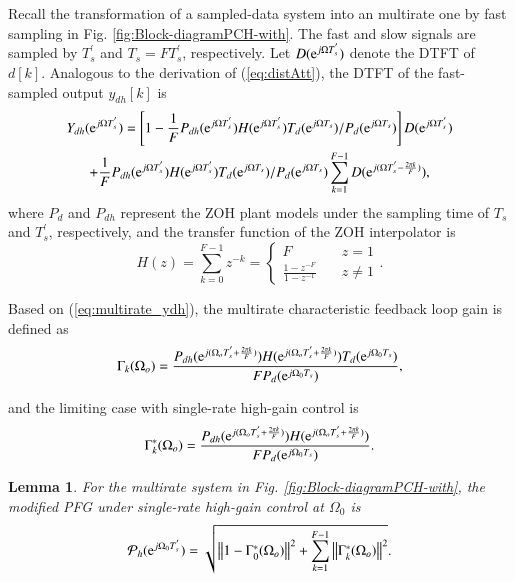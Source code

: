 \documentclass [11pt, proquest] {uwthesis}[2020/02/24]
\newtheorem{lemma}{Lemma}
\begin{document}
Recall the transformation of a sampled-data system into an multirate one
by fast sampling in Fig. \ref{fig:Block-diagramPCH-with}. The fast
and slow signals are sampled by $T_{s}^{'}$ and $T_{s}=FT_{s}^{'}$,
respectively. Let $D(\text{\ensuremath{\mathrm{e}}}^{j\Omega T_{s}^{'}})$
denote the DTFT of $d[k]$. Analogous to the derivation of (\ref{eq:distAtt}),
the DTFT of the fast-sampled output $y_{dh}[k]$ \cite{oomen2007design}
is
\begin{multline}
Y_{dh}(\text{\ensuremath{\mathrm{e}}}^{j\Omega T_{s}^{'}})=\left[1-\frac{1}{F}P_{dh}(\text{\ensuremath{\mathrm{e}}}^{j\Omega T_{s}^{'}})H(\text{\ensuremath{\mathrm{e}}}^{j\Omega T_{s}^{'}})T_{d}(\mathrm{e}^{j\Omega T_{s}})/P_{d}(\mathrm{e}^{j\Omega T_{s}})\right]D(\mathrm{e}^{j\Omega T_{s}^{'}})\\
+\frac{1}{F}P_{dh}(\text{\ensuremath{\mathrm{e}}}^{j\Omega T_{s}^{'}})H(\text{\ensuremath{\mathrm{e}}}^{j\Omega T_{s}^{'}})T_{d}(\mathrm{e}^{j\Omega T_{s}})/P_{d}(\mathrm{e}^{j\Omega T_{s}})\sum_{k=1}^{F-1}D(\mathrm{e}^{j(\Omega T_{s}^{'}-\frac{2\pi k}{F})}),\label{eq:multirate_ydh}
\end{multline}
where $P_{d}$ and $P_{dh}$ represent the ZOH plant models under
the sampling time of $T_{s}$ and $T_{s}^{'}$, respectively, and
the transfer function of the ZOH interpolator is\emph{
\begin{equation}
H(z)=\sum_{k=0}^{F-1}z^{-k}=\begin{cases}
F & \quad z=1\\
\frac{1-z^{-F}}{1-z^{-1}} & \quad z\neq1
\end{cases}.\label{ZOH}
\end{equation}
}

Based on (\ref{eq:multirate_ydh}), the multirate characteristic feedback
loop gain is defined as
\begin{equation}
\Gamma_{k}(\Omega_{o})=\frac{P_{dh}(\mathrm{e}^{j(\Omega_{o}T_{s}^{'}+\frac{2\pi k}{F})})H(\mathrm{e}^{j(\Omega_{o}T_{s}^{'}+\frac{2\pi k}{F})})T_{d}(\mathrm{e}^{j\Omega_{0}T_{s}})}{FP_{d}(\mathrm{e}^{j\Omega_{0}T_{s}})},\label{eq:Gammk_multirate-1}
\end{equation}

\noindent and the limiting case with single-rate high-gain control
is
\begin{equation}
\Gamma_{k}^{*}(\Omega_{o})=\frac{P_{dh}(\mathrm{e}^{j(\Omega_{o}T_{s}^{'}+\frac{2\pi k}{F})})H(\mathrm{e}^{j(\Omega_{o}T_{s}^{'}+\frac{2\pi k}{F})})}{FP_{d}(\mathrm{e}^{j\Omega_{0}T_{s}})}.\label{eq:Gammk_multirate}
\end{equation}
\begin{lemma}\label{For-the-multirate}For the multirate system in Fig. \ref{fig:Block-diagramPCH-with},
the modified PFG under single-rate high-gain control at $\Omega_{0}$
is
\begin{equation}
\mathcal{P}_{h}(\mathrm{e}^{j\Omega_{0}T_{s}^{'}})=\sqrt{\left\Vert 1-\Gamma_{0}^{*}(\Omega_{o})\right\Vert ^{2}+\sum_{k=1}^{F-1}\left\Vert \Gamma_{k}^{*}(\Omega_{o})\right\Vert ^{2}}.\label{eq:PFR DOB}
\end{equation}
\end{lemma}
\end{document}
